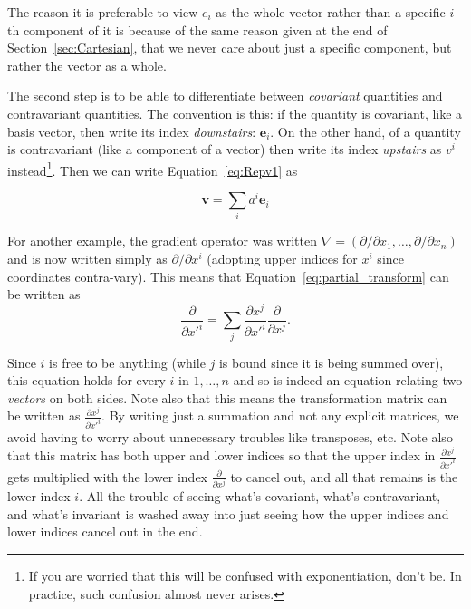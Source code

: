 \documentclass[../master.tex]{subfiles}
\begin{document}
	The reason it is preferable to view $e_i$ as the whole vector rather than a specific $i$th component of it is because of the same reason given at the end of Section~\ref{sec:Cartesian}, that we never care about just a specific component, but rather the vector as a whole. 
	
	The second step is to be able to differentiate between \emph{covariant} quantities and contravariant quantities. The convention is this: if the quantity is covariant, like a basis vector, then write its index \emph{downstairs}: $\mathbf e_i$. On the other hand, of a quantity is contravariant (like a component of a vector) then write its index \emph{upstairs} as $v^i$ instead\footnote{If you are worried that this will be confused with exponentiation, don't be. In practice, such confusion almost never arises.}. Then we can write Equation~\eqref{eq:Repv1} as 
	
	\begin{equation}
		\mathbf v = \sum_{i} a^i \mathbf e_i
	\end{equation}
	
	For another example, the gradient operator was written $\nabla = (\partial/\partial x_1, \dots, \partial/\partial x_n)$ and is now written simply as $\partial/\partial x^i$ (adopting upper indices for $x^i$ since coordinates contra-vary). This means that Equation~\eqref{eq:partial_transform} can be written as
	\begin{equation}\label{eq:partial_transform2}
		\frac{\partial}{\partial {x'}^i} = \sum_{j} \frac{\partial x^j}{\partial {x'}^i} \frac{\partial}{\partial x^j}.
	\end{equation}
	
	Since $i$ is free to be anything (while $j$ is bound since it is being summed over), this equation holds for every $i$ in $1,\dots, n$ and so is indeed an equation relating two \emph{vectors} on both sides. Note also that this means the transformation matrix can be written as $\frac{\partial x^j}{\partial {x'}^i}$. By writing just a summation and not any explicit matrices, we avoid having to worry about unnecessary troubles like transposes, etc. Note also that this matrix has both upper and lower indices so that the upper index in $\frac{\partial x^j}{\partial {x'}^i}$ gets multiplied with the lower index $\frac{\partial}{\partial x^j}$ to cancel out, and all that remains is the lower index $i$. All the trouble of seeing what's covariant, what's contravariant, and what's invariant is washed away into just seeing how the upper indices and lower indices cancel out in the end.
	
\end{document}
